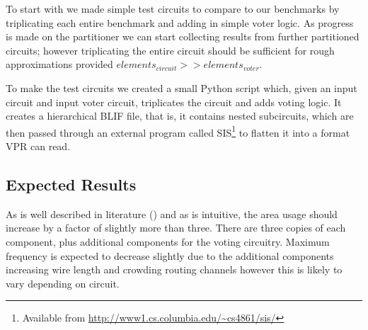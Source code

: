 \documentclass[12pt,final,oneside]{memoir} %
\begin{document}
To start with we made simple test circuits to compare to our benchmarks by triplicating each entire benchmark and adding in simple voter logic. As progress is made on the partitioner we can start collecting results from further partitioned circuits; however triplicating the entire circuit should be sufficient for rough approximations provided $elements_{circuit} >> elements_{voter}$.

To make the test circuits we created a small Python script which, given an input circuit and input voter circuit, triplicates the circuit and adds voting logic. It creates a hierarchical \ac{BLIF} file, that is, it contains nested subcircuits, which are then passed through an external program called \ac{SIS}\footnote{Available from \url{http://www1.cs.columbia.edu/~cs4861/sis/}} to flatten it into a format \ac{VPR} can read.

\subsection{Expected Results}
As is well described in literature (\cite{HardeningTechniques}) and as is intuitive, the area usage should increase by a factor of slightly more than three. There are three copies of each component, plus additional components for the voting circuitry. Maximum frequency is expected to decrease slightly due to the additional components increasing wire length and crowding routing channels however this is likely to vary depending on circuit.
\end{document}
